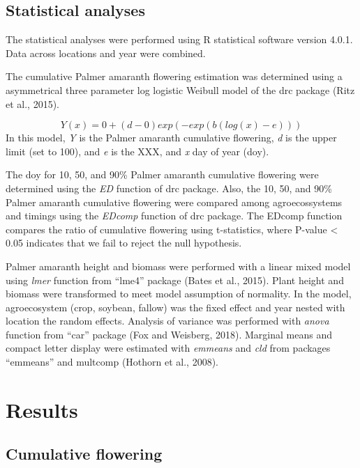 \documentclass[utf8]{frontiersSCNS}
\begin{document}
\hypertarget{statistical-analyses}{%
\subsection*{Statistical analyses}\label{statistical-analyses}}

The statistical analyses were performed using R statistical software
version 4.0.1. Data across locations and year were combined.

The cumulative Palmer amaranth flowering estimation was determined using
a asymmetrical three parameter log logistic Weibull model of the drc
package (Ritz et al., 2015).

\[Y(x) = 0 + (d-0) exp (-exp(b(log(x)-e)))\] In this model, \emph{Y} is
the Palmer amaranth cumulative flowering, \emph{d} is the upper limit
(set to 100), and \emph{e} is the XXX, and \emph{x} day of year (doy).

The doy for 10, 50, and 90\% Palmer amaranth cumulative flowering were
determined using the \emph{ED} function of drc package. Also, the 10,
50, and 90\% Palmer amaranth cumulative flowering were compared among
agroecossystems and timings using the \emph{EDcomp} function of drc
package. The EDcomp function compares the ratio of cumulative flowering
using t-statistics, where P-value \textless{} 0.05 indicates that we
fail to reject the null hypothesis.

Palmer amaranth height and biomass were performed with a linear mixed
model using \emph{lmer} function from ``lme4'' package (Bates et al.,
2015). Plant height and biomass were transformed to meet model
assumption of normality. In the model, agroecosystem (crop, soybean,
fallow) was the fixed effect and year nested with location the random
effects. Analysis of variance was performed with \emph{anova} function
from ``car'' package (Fox and Weisberg, 2018). Marginal means and
compact letter display were estimated with \emph{emmeans} and \emph{cld}
from packages ``emmeans'' and multcomp (Hothorn et al., 2008).

\hypertarget{results}{%
\section*{Results}\label{results}}

\hypertarget{cumulative-flowering}{%
\subsection*{Cumulative flowering}\label{cumulative-flowering}}
\end{document}
